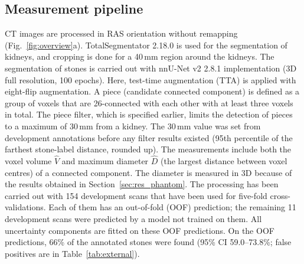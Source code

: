 \documentclass[conference]{IEEEtran}
\begin{document}
\subsection{Measurement pipeline}
CT images are processed in RAS orientation without remapping (Fig.~\ref{fig:overview}a). TotalSegmentator 2.18.0 \cite{wasserthal2023} is used for the segmentation of kidneys, and cropping is done for a 40\,mm region around the kidneys. The segmentation of stones is carried out with nnU-Net v2 2.8.1 \cite{isensee2021} implementation (3D full resolution, 100 epochs). Here, test-time augmentation (TTA) is applied with eight-flip augmentation. A piece (candidate connected component) is defined as a group of voxels that are 26-connected with each other with at least three voxels in total. The piece filter, which is specified earlier, limits the detection of pieces to a maximum of 30\,mm from a kidney. The 30\,mm value was set from development annotations before any filter results existed (95th percentile of the farthest stone-label distance, rounded up). The measurements include both the voxel volume $\hat V$ and maximum diameter $\hat D$ (the largest distance between voxel centres) of a connected component. The diameter is measured in 3D because of the results obtained in Section~\ref{sec:res_phantom}. The processing has been carried out with 154 development scans that have been used for five-fold cross-validations. Each of them has an out-of-fold (OOF) prediction; the remaining 11 development scans were predicted by a model not trained on them. All uncertainty components are fitted on these OOF predictions. On the OOF predictions, 66\% of the annotated stones were found (95\% CI 59.0--73.8\%; false positives are in Table~\ref{tab:external}).
\end{document}

